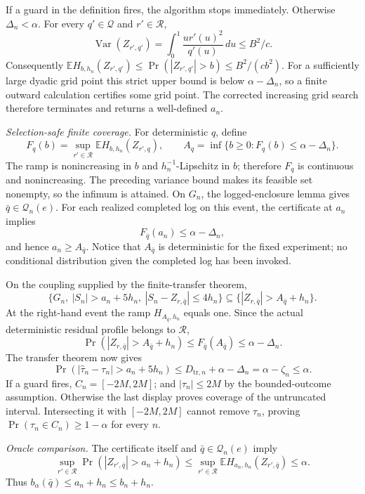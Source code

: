 If a guard in the definition fires, the algorithm stops immediately.  Otherwise
\(\Delta_n<\alpha\).  For every \(q'\in\mathcal Q\) and \(r'\in\mathcal R\),
\[
 \operatorname{Var}(Z_{r',q'})
 =\int_0^1\frac{u r'(u)^2}{q'(u)}\,du
 \leq B^2/c.
\]
Consequently
\(\mathbb EH_{b,h_n}(Z_{r',q'})
\leq\Pr(|Z_{r',q'}|>b)\leq B^2/(cb^2)\).
For a sufficiently large dyadic grid point this strict upper bound is below
\(\alpha-\Delta_n\), so a finite outward calculation certifies some grid point.
The corrected increasing grid search therefore terminates and returns a well-defined \(a_n\).

\emph{Selection-safe finite coverage.}
For deterministic \(q\), define
\[
 F_q(b)=\sup_{r'\in\mathcal R}
          \mathbb EH_{b,h_n}(Z_{r',q}),\qquad
 A_q=\inf\{b\geq0:F_q(b)\leq\alpha-\Delta_n\}.
\]
The ramp is nonincreasing in \(b\) and \(h_n^{-1}\)-Lipschitz in \(b\);
therefore \(F_q\) is continuous and nonincreasing.  The preceding variance bound makes its feasible set nonempty, so the infimum is attained.
On \(G_n\), the logged-enclosure lemma gives
\(\bar q\in\mathcal Q_n(e)\).  For each realized completed log on this event, the certificate at \(a_n\) implies
\[
 F_{\bar q}(a_n)\leq\alpha-\Delta_n,
\]
and hence \(a_n\geq A_{\bar q}\).  Notice that \(A_{\bar q}\) is deterministic for the fixed experiment; no conditional distribution given the completed log has been invoked.

On the coupling supplied by the finite-transfer theorem,
\[
 \{G_n,\ |S_n|>a_n+5h_n,\ |S_n-Z_{r,\bar q}|\leq4h_n\}
 \subseteq\{|Z_{r,\bar q}|>A_{\bar q}+h_n\}.
\]
At the right-hand event the ramp \(H_{A_{\bar q},h_n}\) equals one.  Since the actual deterministic residual profile belongs to \(\mathcal R\),
\[
 \Pr(|Z_{r,\bar q}|>A_{\bar q}+h_n)
 \leq F_{\bar q}(A_{\bar q})
 \leq\alpha-\Delta_n.
\]
The transfer theorem now gives
\[
 \Pr(|\widehat\tau_n-\tau_n|>a_n+5h_n)
 \leq D_{\mathrm{tr},n}+\alpha-\Delta_n
 =\alpha-\zeta_n\leq\alpha.
\]
If a guard fires, \(C_n=[-2M,2M]\); and
\(|\tau_n|\leq2M\) by the bounded-outcome assumption.  Otherwise the last display proves coverage of the untruncated interval.  Intersecting it with
\([-2M,2M]\) cannot remove \(\tau_n\), proving
\(\Pr(\tau_n\in C_n)\geq1-\alpha\) for every \(n\).

\emph{Oracle comparison.}
The certificate itself and \(\bar q\in\mathcal Q_n(e)\) imply
\[
 \sup_{r'\in\mathcal R}
 \Pr(|Z_{r',\bar q}|>a_n+h_n)
 \leq\sup_{r'\in\mathcal R}
 \mathbb EH_{a_n,h_n}(Z_{r',\bar q})
 \leq\alpha.
\]
Thus \(b_\alpha(\bar q)\leq a_n+h_n\leq b_n+h_n\).

